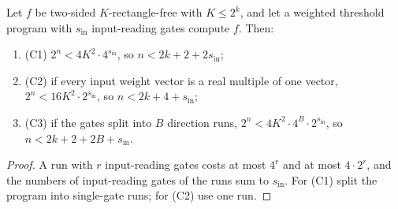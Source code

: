 \begin{corollary}
  \label{cor:lowerbounds-threshold-gate-bounds}
  \leanok
  Let $f$ be two-sided $K$-rectangle-free with $K\le2^k$, and let a weighted
  threshold program with $s_{\mathrm{in}}$ input-reading gates compute $f$. Then:
  \begin{enumerate}
    \item (C1) $2^n<4K^2\cdot4^{s_{\mathrm{in}}}$, so $n<2k+2+2s_{\mathrm{in}}$;
    \item (C2) if every input weight vector is a real multiple of one vector,
      $2^n<16K^2\cdot2^{s_{\mathrm{in}}}$, so $n<2k+4+s_{\mathrm{in}}$;
    \item (C3) if the gates split into $B$ direction runs,
      $2^n<4K^2\cdot4^B\cdot2^{s_{\mathrm{in}}}$, so $n<2k+2+2B+s_{\mathrm{in}}$.
  \end{enumerate}
\end{corollary}
\begin{proof}
  \leanok
  A run with $r$ input-reading gates costs at most $4^r$ and at most $4\cdot2^r$,
  and the numbers of input-reading gates of the runs sum to $s_{\mathrm{in}}$. For
  (C1) split the program into single-gate runs; for (C2) use one run.
\end{proof}

